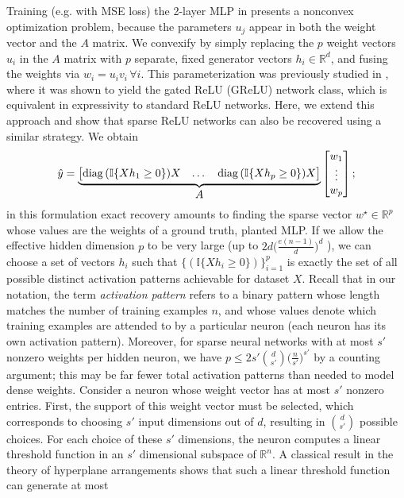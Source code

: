 \documentclass{article} %
\newcommand{\measurement}{y}
\newcommand{\n}{\ensuremath{n}}
\newcommand{\p}{\ensuremath{p}}
\newcommand{\datadim}{\ensuremath{d}}
\newcommand{\X}{\ensuremath{X}}
\newcommand{\w}{\ensuremath{w}}
\newcommand{\h}{\ensuremath{h}}
\DeclareMathOperator{\diag}{diag}
\newcommand{\1}{\ensuremath{{\sf (i)}}}
\newcommand{\2}{\ensuremath{{\sf (ii)}}}
\newcommand{\3}{\ensuremath{{\sf (iii)}}}
\newcommand{\4}{\ensuremath{{\sf (iv)}}}
\newcommand{\5}{\ensuremath{{\sf (v)}}}
\newcommand{\6}{\ensuremath{{\sf (vi)}}}
\newcommand{\R}{\mathbb{R}}
\begin{document}
Training (e.g. with MSE loss) the 2-layer MLP in  presents a nonconvex optimization problem, because the parameters $u_j$ appear in both the weight vector and the $A$ matrix. We convexify by simply replacing the $\p$ weight vectors $ u_i$ in the $A$ matrix with $\p$ separate, fixed generator vectors $\h_i \in \R^\datadim$, and fusing the weights via $w_i=u_iv_i\,\forall i$. This parameterization was previously studied in \cite{mishkin2022fast}, where it was shown to yield the gated ReLU (GReLU) network class, which is equivalent in expressivity to standard ReLU networks. Here, we extend this approach and show that sparse ReLU networks can also be recovered using a similar strategy. We obtain
\begin{equation}
\label{eq:convexAhnotation}
    \hat\measurement = \underbrace{\begin{bmatrix}
        \diag{(\mathbb{I}\{\X\h_1 \geq 0\})}\X & \dots & \diag{(\mathbb{I}\{\X\h_\p \geq 0\})}\X
    \end{bmatrix}}_{\displaystyle\Large A} \begin{bmatrix}
        \w_1 \\
        \vdots \\
        \w_\p
    \end{bmatrix} ;
\end{equation}
in this formulation exact recovery amounts to finding the sparse vector $w^\star \in \R^\p$ whose values are the weights of a ground truth, planted MLP.
If we allow the effective hidden dimension $\p$ to be very large (up to $2\datadim\big(\frac{e(\n-1)}{\datadim}\big)^\datadim$ \citep{pilanci2020neural}), we can choose a set of vectors $\h_i$ such that $\{(\mathbb{I}\{\X\h_i\geq 0\})\}_{i=1}^\p$ is exactly the set of all possible distinct activation patterns achievable for dataset $\X$. 
Recall that in our notation, the term \emph{activation pattern} refers to a binary pattern whose length matches the number of training examples $\n$, and whose values denote which training examples are attended to by a particular neuron (each neuron has its own activation pattern).
Moreover, for sparse neural networks with at most $s'$ nonzero weights per hidden neuron, we have $p\le 2s'{\datadim \choose s'}{(\frac{n}{s'}})^{s'}$ by a counting argument; this may be far fewer total activation patterns than needed to model dense weights. 
Consider a neuron whose weight vector has at most 
$s'$ nonzero entries. First, the support of this weight vector must be selected, which corresponds to choosing $s'$ input dimensions out of $\datadim$, resulting in $\datadim \choose s'$ possible choices. For each choice of these $s'$ dimensions, the neuron computes a linear threshold function in an $s'$ dimensional subspace of $\R^\n$. A classical result in the theory of hyperplane arrangements \citep{stanley2007introduction} shows that such a linear threshold function can generate at most 
\end{document}
